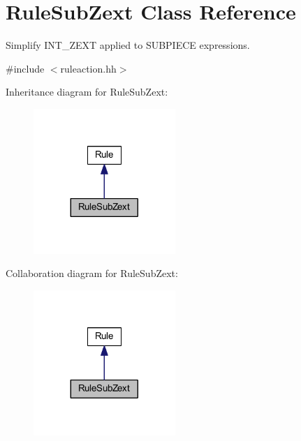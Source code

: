 \hypertarget{class_rule_sub_zext}{}\section{Rule\+Sub\+Zext Class Reference}
\label{class_rule_sub_zext}


Simplify I\+N\+T\+\_\+\+Z\+E\+XT applied to S\+U\+B\+P\+I\+E\+CE expressions.  




{\ttfamily \#include $<$ruleaction.\+hh$>$}



Inheritance diagram for Rule\+Sub\+Zext\+:
\nopagebreak
\begin{figure}[H]
\begin{center}
\leavevmode
\includegraphics[width=152pt]{class_rule_sub_zext__inherit__graph}
\end{center}
\end{figure}


Collaboration diagram for Rule\+Sub\+Zext\+:
\nopagebreak
\begin{figure}[H]
\begin{center}
\leavevmode
\includegraphics[width=152pt]{class_rule_sub_zext__coll__graph}
\end{center}
\end{figure}
